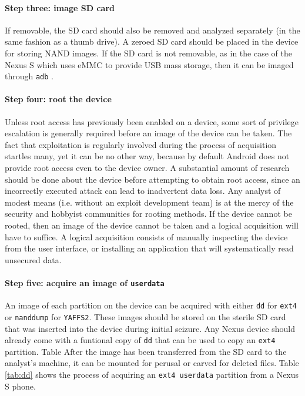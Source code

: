 \paragraph{Step three: image SD card}
 If removable, the SD card should also be removed and analyzed separately (in the same fashion as a thumb drive). A zeroed SD card
should be placed in the device for storing NAND images. If the SD card is not removable, as in the case of the Nexus S which uses
eMMC to provide USB mass storage, then it can be imaged through \texttt{adb} \cite[pp. 211-218]{hoog}.
 
\paragraph{Step four: root the device}
Unless root access has previously been enabled on a device, some sort of privilege escalation is generally required before an image
of the device can be taken. The fact that exploitation is regularly involved during the process of acquisition startles many, yet it
can be no other way, because by default Android does not provide root access even to the device owner.  A substantial amount of
research should be done about the device before attempting to obtain root access, since an incorrectly executed attack can lead to
inadvertent data loss. Any analyst of modest means (i.e. without an exploit development team) is at the mercy of the security and
hobbyist communities for rooting methods. If the device cannot be rooted, then an image of the device cannot be taken and a logical
acquisition will have to suffice. A logical acquisition consists of manually inspecting the device from the user interface, or
installing an application that will systematically read unsecured data.

\paragraph{Step five: acquire an image of \texttt{userdata}}
An image of each partition on the device can be acquired with either \texttt{dd} for \texttt{ext4} or \texttt{nanddump} for
\texttt{YAFFS2}.  These images should be stored on the sterile SD card that was inserted into the device during initial seizure. Any
Nexus device should already come with a funtional copy of \texttt{dd} that can be used to copy an \texttt{ext4} partition. Table
After the image has been transferred from the SD card to the analyst's machine, it can be mounted for perusal or carved for
deleted files.  Table \ref{tab:dd} shows the process of acquiring an \texttt{ext4 userdata} partition from a Nexus S phone.

